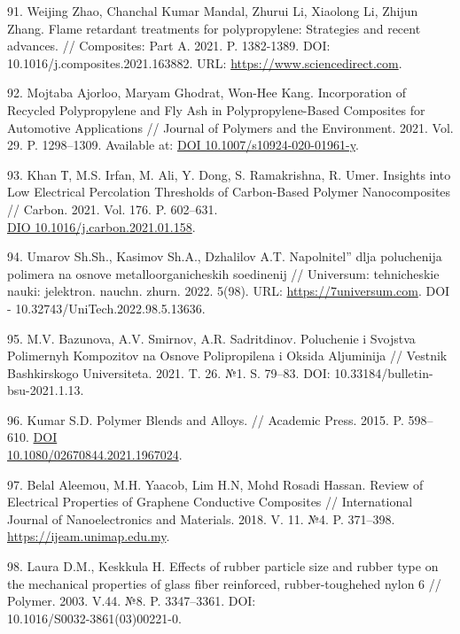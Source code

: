 \begin{references}
91. Weijing Zhao, Chanchal Kumar Mandal, Zhurui Li, Xiaolong Li,
Zhijun Zhang. Flame retardant treatments for polypropylene: Strategies
and recent advances. // Composites: Part A. 2021. P. 1382-1389. DOI:
10.1016/j.composites.2021.163882. URL: \href{https://www.sciencedirect.com/science/article/abs/pii/S1359836821001219}{https://www.sciencedirect.com}.

92. Mojtaba Ajorloo, Maryam Ghodrat, Won-Hee Kang. Incorporation of
Recycled Polypropylene and Fly Ash in Polypropylene-Based Composites
for Automotive Applications // Journal of Polymers and the
Environment. 2021. Vol. 29. P. 1298–1309. Available
at: \href{https://doi.org/10.1007/s10924-020-01961-y}{DOI 10.1007/s10924-020-01961-y}.

93. Khan Т, M.S. Irfan, M. Ali, Y. Dong, S. Ramakrishna,
R. Umer. Insights into Low Electrical Percolation Thresholds of
Carbon-Based Polymer Nanocomposites //
Carbon. 2021. Vol. 176. P. 602–631. \\\href{https://doi.org/10.1016/j.carbon.2021.01.158}{DIO 10.1016/j.carbon.2021.01.158}.

94. Umarov Sh.Sh., Kasimov Sh.A., Dzhalilov A.T. Napolnitel'' dlja
poluchenija polimera na osnove metalloorganicheskih soedinenij //
Universum: tehnicheskie nauki:
jelektron. nauchn. zhurn. 2022. 5(98). URL: \href{https://7universum.com/ru/tech/archive/item/13636}{https://7universum.com}. DOI
- 10.32743/UniTech.2022.98.5.13636.

95. M.V. Bazunova, A.V. Smirnov, A.R. Sadritdinov. Poluchenie i
Svojstva Polimernyh Kompozitov na Osnove Polipropilena i Oksida
Aljuminija // Vestnik Bashkirskogo
Universiteta. 2021. T. 26. №1. S. 79–83. DOI:
10.33184/bulletin-bsu-2021.1.13.

96. Kumar S.D. Polymer Blends and Alloys. // Academic
Press. 2015. P. 598–610. \href{https://doi.org/10.1080/02670844.2021.1967024}{DOI \\10.1080/02670844.2021.1967024}.

97. Belal Aleemou, M.H. Yaacob, Lim H.N, Mohd Rosadi Hassan. Review of
Electrical Properties of Graphene Conductive Composites //
International Journal of Nanoelectronics and
Materials. 2018. V. 11. №4. P. 371–398.
\href{https://ijeam.unimap.edu.my/images/PDF/IJNEAM\%20No.\%204\%202018\%20OCT/Vol_11_No_4_2018_1_371-398}{https://ijeam.unimap.edu.my}.

98. Laura D.M., Keskkula H. Effects of rubber particle size and rubber
type on the mechanical properties of glass fiber reinforced,
rubber-toughehed nylon 6 //
Polymer. 2003. V.44. №8. P. 3347–3361. DOI: \\10.1016/S0032-3861(03)00221-0.


\end{references}
